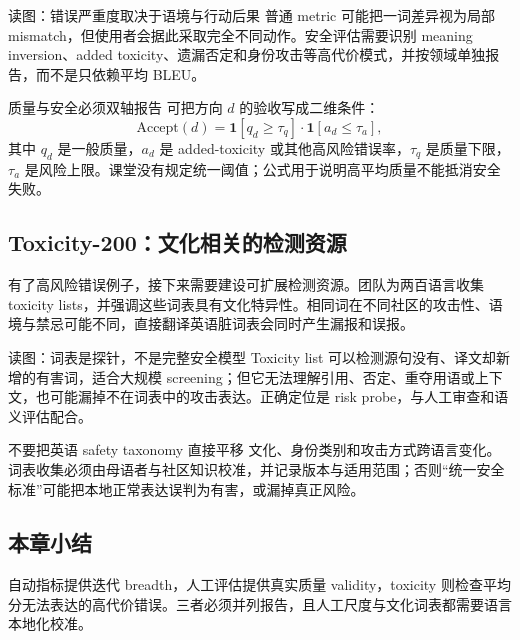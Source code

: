 
\begin{knowledgebox}{读图：错误严重度取决于语境与行动后果}
普通 metric 可能把一词差异视为局部 mismatch，但使用者会据此采取完全不同动作。安全评估需要识别 meaning inversion、added toxicity、遗漏否定和身份攻击等高代价模式，并按领域单独报告，而不是只依赖平均 BLEU。
\end{knowledgebox}

\begin{importantbox}{质量与安全必须双轴报告}
可把方向 $d$ 的验收写成二维条件：
\[
\text{Accept}(d)=\mathbf{1}[q_d\ge\tau_q]\cdot
\mathbf{1}[a_d\le\tau_a],
\]
其中 $q_d$ 是一般质量，$a_d$ 是 added-toxicity 或其他高风险错误率，$\tau_q$ 是质量下限，$\tau_a$ 是风险上限。课堂没有规定统一阈值；公式用于说明高平均质量不能抵消安全失败。
\end{importantbox}


\subsection{Toxicity-200：文化相关的检测资源}

有了高风险错误例子，接下来需要建设可扩展检测资源。团队为两百语言收集 toxicity lists，并强调这些词表具有文化特异性。相同词在不同社区的攻击性、语境与禁忌可能不同，直接翻译英语脏词表会同时产生漏报和误报。


\begin{knowledgebox}{读图：词表是探针，不是完整安全模型}
Toxicity list 可以检测源句没有、译文却新增的有害词，适合大规模 screening；但它无法理解引用、否定、重夺用语或上下文，也可能漏掉不在词表中的攻击表达。正确定位是 risk probe，与人工审查和语义评估配合。
\end{knowledgebox}

\begin{warningbox}{不要把英语 safety taxonomy 直接平移}
文化、身份类别和攻击方式跨语言变化。词表收集必须由母语者与社区知识校准，并记录版本与适用范围；否则“统一安全标准”可能把本地正常表达误判为有害，或漏掉真正风险。
\end{warningbox}

\subsection{本章小结}

自动指标提供迭代 breadth，人工评估提供真实质量 validity，toxicity 则检查平均分无法表达的高代价错误。三者必须并列报告，且人工尺度与文化词表都需要语言本地化校准。


